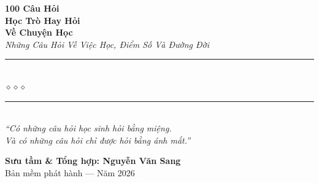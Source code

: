 \begin{titlepage}
\begin{center}
  {\fontsize{28}{34}\selectfont\bfseries\color{oliveink!80!black}
    100 Câu Hỏi}\\[0.4cm]
  {\fontsize{28}{34}\selectfont\bfseries\color{papergold!80!black}
    Học Trò Hay Hỏi}\\[0.4cm]
  {\fontsize{28}{34}\selectfont\bfseries\color{oliveink!80!black}
    Về Chuyện Học}\\[0.4cm]

  {\fontsize{16}{20}\selectfont\color{papergold!90!black}\itshape
    Những Câu Hỏi Về Việc Học, Điểm Số Và Đường Đời}\\[1cm]

  {\color{warmbrown!60}\rule{6cm}{1pt}}\\[5pt]
  {\color{papergold!80!black}\large$\diamond$\hspace{1cm}$\diamond$\hspace{1cm}$\diamond$}\\[5pt]
  {\color{warmbrown!60}\rule{6cm}{1pt}}\\[1.5cm]

  {\normalsize\itshape\color{warmbrown!90!black}
   ``Có những câu hỏi học sinh hỏi bằng miệng.\\
   Và có những câu hỏi chỉ được hỏi bằng ánh mắt.''}

  \vfill

  {\fontsize{16}{20}\selectfont\bfseries\color{warmbrown!90!black}
    Sưu tầm \& Tổng hợp: \textbf{Nguyễn Văn Sang}}\\[0.4cm]

  {\small\color{gray} Bản mềm phát hành --- Năm 2026}\\[0.5cm]
\end{center}

\afterpage{\nopagecolor}
\end{titlepage}